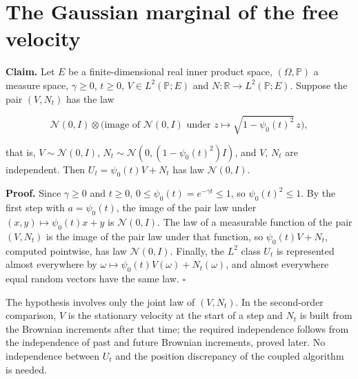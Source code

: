 \documentclass[11pt,a4paper]{article}
\begin{document}
\section{\texorpdfstring{The Gaussian marginal of the free velocity}{The Gaussian marginal of the free velocity}}


\textbf{Claim.} Let \(E\) be a finite-dimensional real inner product space, \((\Omega,\mathbb P)\) a measure space, \(\gamma\ge0\), \(t\ge0\), \(V\in L^2(\mathbb P;E)\) and \(N:\mathbb R\to L^2(\mathbb P;E)\). Suppose the pair \((V,N_t)\) has the law


\[\mathcal N(0,I)\otimes\bigl(\text{image of }\mathcal N(0,I)\text{ under }z\mapsto\sqrt{1-\psi_0(t)^2}\,z\bigr),\]


that is, \(V\sim\mathcal N(0,I)\), \(N_t\sim\mathcal N(0,(1-\psi_0(t)^2)I)\), and \(V\), \(N_t\) are independent. Then \(U_t=\psi_0(t)V+N_t\) has law \(\mathcal N(0,I)\).




\textbf{Proof.} Since \(\gamma\ge0\) and \(t\ge0\), \(0\le\psi_0(t)=e^{-\gamma t}\le1\), so \(\psi_0(t)^2\le1\). By the first step with \(a=\psi_0(t)\), the image of the pair law under \((x,y)\mapsto\psi_0(t)x+y\) is \(\mathcal N(0,I)\). The law of a measurable function of the pair \((V,N_t)\) is the image of the pair law under that function, so \(\psi_0(t)V+N_t\), computed pointwise, has law \(\mathcal N(0,I)\). Finally, the \(L^2\) class \(U_t\) is represented almost everywhere by \(\omega\mapsto\psi_0(t)V(\omega)+N_t(\omega)\), and almost everywhere equal random vectors have the same law. \(\square\)




The hypothesis involves only the joint law of \((V,N_t)\). In the second-order comparison, \(V\) is the stationary velocity at the start of a step and \(N_t\) is built from the Brownian increments after that time; the required independence follows from the independence of past and future Brownian increments, proved later. No independence between \(U_t\) and the position discrepancy of the coupled algorithm is needed.
\end{document}
